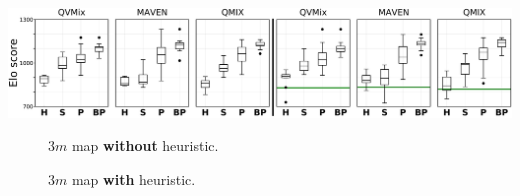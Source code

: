 \captionsetup[subfigure]{justification=centering}
    \includegraphics[width=.95\textwidth]{tex_thesis/figures/ch7/3m_tiny_six_qvmix_maven_qmix.pdf}
    \begin{subfigure}{.045\textwidth}
    \centering
    \caption*{}
    \end{subfigure}%
    \begin{subfigure}{.455\textwidth}
        \begin{subfigure}{.33\textwidth}
            \renewcommand\thesubfigure{\alph{subfigure}.1}
          \centering
          \caption{}
          \label{subfig:elo_no_h_methodQVMIX}
        \end{subfigure}%
        \begin{subfigure}{.33\textwidth}
        \addtocounter{subfigure}{-1}
            \renewcommand\thesubfigure{\alph{subfigure}.2}
          \centering
          \caption{}
          \label{subfig:elo_no_h_methodMAVEN}
        \end{subfigure}%
        \begin{subfigure}{.33\textwidth}
        \addtocounter{subfigure}{-1}
            \renewcommand\thesubfigure{\alph{subfigure}.3}
          \centering
          \caption{}
          \label{subfig:elo_no_h_methodQMIX}
        \end{subfigure}%
    \centering
    \addtocounter{subfigure}{-1}
    \caption{$3m$ map \textbf{without} heuristic.}
    \label{subfig:elo_no_h_3m}
    \end{subfigure}%
    \begin{subfigure}{.455\textwidth}
        \begin{subfigure}{.33\textwidth}
        \renewcommand\thesubfigure{\alph{subfigure}.1}
          \centering
          \caption{ }
          \label{subfig:elo_h_methodQVMIX}
        \end{subfigure}%
        \begin{subfigure}{.33\textwidth}
         \addtocounter{subfigure}{-1}
        \renewcommand\thesubfigure{\alph{subfigure}.2}
          \centering
          \caption{ }
          \label{subfig:elo_h_methodMAVEN}
        \end{subfigure}%
        \begin{subfigure}{.33\textwidth}
            \addtocounter{subfigure}{-1}
            \renewcommand\thesubfigure{\alph{subfigure}.3}
          \centering
          \caption{ }
          \label{subfig:elo_h_methodQMIX}
        \end{subfigure}%
    \centering
    \addtocounter{subfigure}{-1}
    \caption{$3m$ map \textbf{with} heuristic.}
     \label{subfig:elo_h_3m}
    \end{subfigure}%
    
